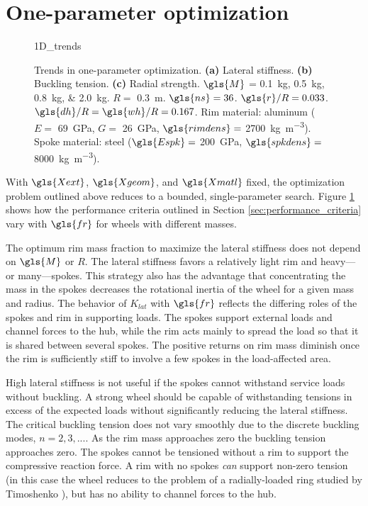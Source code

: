 \documentclass[\rootdir/thesis.tex]{subfiles}
\begin{document}
\section{One-parameter optimization}



\begin{figure}
\centering
{1D_trends}
\caption{Trends in one-parameter optimization. \textbf{(a)} Lateral stiffness. \textbf{(b)} Buckling tension. \textbf{(c)} Radial strength. $\gls{M}$ = \SIlist[list-units=single]{0.1;0.5;0.8;2.0}{kg}. $R=$ \SI{0.3}{m}. $\gls{ns}=36$. $\gls{r}/R=0.033$. $\gls{dh}/R=\gls{wh}/R=0.167$. Rim material: aluminum ($E=$ \SI{69}{GPa}, $G=$ \SI{26}{GPa}, $\gls{rimdens}=$ \SI{2700}{kg.m^{-3}}). Spoke material: steel ($\gls{Espk}=$ \SI{200}{GPa}, $\gls{spkdens}=$ \SI{8000}{kg.m^{-3}}).}
\label{fig:opt_1D_trends}
\end{figure}

With $\gls{Xext}$, $\gls{Xgeom}$, and $\gls{Xmatl}$ fixed, the optimization problem outlined above reduces to a bounded, single-parameter search. Figure \ref{fig:opt_1D_trends} shows how the performance criteria outlined in Section \ref{sec:performance_criteria} vary with $\gls{fr}$ for wheels with different masses. 

The optimum rim mass fraction to maximize the lateral stiffness does not depend on $\gls{M}$ or $R$. The lateral stiffness favors a relatively light rim and heavy---or many---spokes. This strategy also has the advantage that concentrating the mass in the spokes decreases the rotational inertia of the wheel for a given mass and radius. The behavior of $K_{lat}$ with $\gls{fr}$ reflects the differing roles of the spokes and rim in supporting loads. The spokes support external loads and channel forces to the hub, while the rim acts mainly to spread the load so that it is shared between several spokes. The positive returns on rim mass diminish once the rim is sufficiently stiff to involve a few spokes in the load-affected area.

High lateral stiffness is not useful if the spokes cannot withstand service loads without buckling. A strong wheel should be capable of withstanding tensions in excess of the expected loads without significantly reducing the lateral stiffness. The critical buckling tension does not vary smoothly due to the discrete buckling modes, $n=2,3,...$. As the rim mass approaches zero the buckling tension approaches zero. The spokes cannot be tensioned without a rim to support the compressive reaction force. A rim with no spokes \emph{can} support non-zero tension (in this case the wheel reduces to the problem of a radially-loaded ring studied by Timoshenko \cite{Timoshenko1961}), but has no ability to channel forces to the hub.
\end{document}
